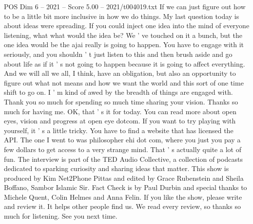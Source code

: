 \begin{textsample}{POS Dim 6 – 2021 – Score 5.00 – 2021/t004019.txt}
If we can just figure out how to be a little bit more inclusive in how we do things.
My last question today is about ideas were spreading.
If you could inject one idea into the mind of everyone listening, what what would the idea be?
We ' ve touched on it a bunch, but the one idea would be the ajai really is going to happen.
You have to engage with it seriously, and you shouldn ' t just listen to this and then brush aside and go about life as if it ' s not going to happen because it is going to affect everything.
And we will all we all, I think, have an obligation, but also an opportunity to figure out what not means and how we want the world and this sort of one time shift to go on.
I ' m kind of awed by the breadth of things are engaged with.
Thank you so much for spending so much time sharing your vision.
Thanks so much for having me.
OK, that ' s it for today.
You can read more about open eyes, vision and progress at open eye dotcom.
If you want to try playing with yourself, it ' s a little tricky.
You have to find a website that has licensed the API.
The one I went to was philosopher ehi dot com, where you just you pay a few dollars to get access to a very strange mind.
That ' s actually quite a lot of fun.
The interview is part of the TED Audio Collective, a collection of podcasts dedicated to sparking curiosity and sharing ideas that matter.
This show is produced by Kim Net2Phone Pittas and edited by Grace Rubenstein and Sheila Boffano, Sambor Islamic Sir.
Fact Check is by Paul Durbin and special thanks to Michele Quent, Colin Helmes and Anna Felin.
If you like the show, please write and review it.
It helps other people find us.
We read every review, so thanks so much for listening.
See you next time.

\end{textsample}
